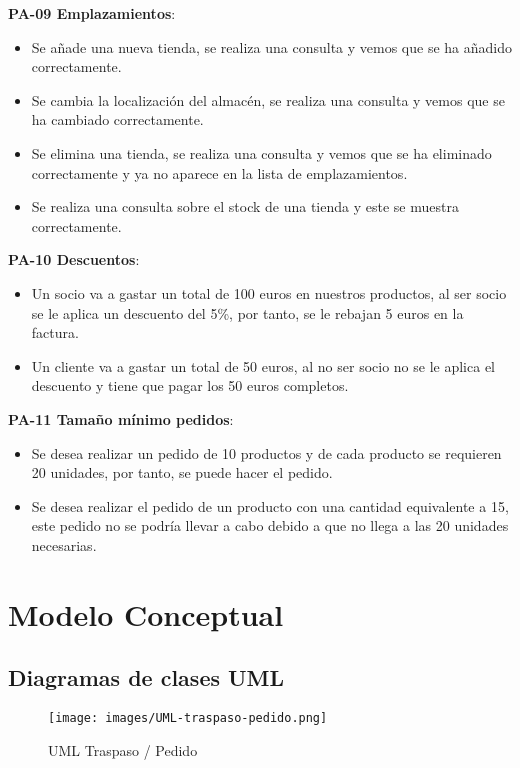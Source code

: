 \textbf{PA-09 Emplazamientos}:
\begin{itemize}
	\item Se añade una nueva tienda, se realiza una consulta y vemos que se ha añadido correctamente.
	\item Se cambia la localización del almacén, se realiza una consulta y vemos que se ha cambiado correctamente.
	\item Se elimina una tienda, se realiza una consulta y vemos que se ha eliminado correctamente y ya no aparece en la lista de emplazamientos.
	\item Se realiza una consulta sobre el stock de una tienda y este se muestra correctamente.
\end{itemize}

\textbf{PA-10 Descuentos}:
\begin{itemize}
	\item Un socio va a gastar un total de 100 euros en nuestros productos, al ser socio se le aplica un descuento del 5\%, por tanto, se le rebajan 5 euros en la factura.
	\item Un cliente va a gastar un total de 50 euros, al no ser socio no se le aplica el descuento y tiene que pagar los 50 euros completos.
\end{itemize}

\textbf{PA-11 Tamaño mínimo pedidos}:
\begin{itemize}
	\item Se desea realizar un pedido de 10 productos y de cada producto se requieren 20 unidades, por tanto, se puede hacer el pedido.
	\item Se desea realizar el pedido de un producto con una cantidad equivalente a 15, este pedido no se podría llevar a cabo debido a que no llega a las 20 unidades necesarias.
\end{itemize}


\section{Modelo Conceptual}
\subsection{Diagramas de clases UML}

\begin{figure}[H]
	\texttt{[image: images/UML-traspaso-pedido.png]}
	\caption{UML Traspaso / Pedido}
\end{figure}

